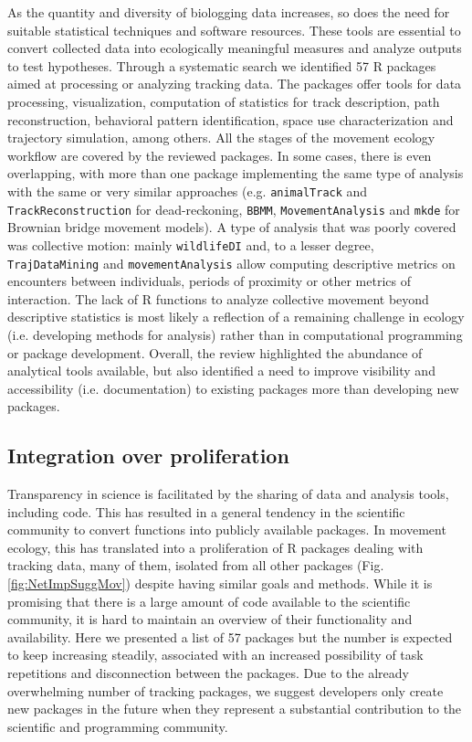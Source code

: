 \documentclass[a4paper,12pt]{article}
\newcommand{\Rpkg}[1]{\texttt{#1}}
\begin{document}
	As the quantity and diversity of biologging data increases, so does the need for suitable statistical techniques and software resources. These tools are essential to convert collected data into ecologically meaningful measures and analyze outputs to test hypotheses. Through a systematic search we identified 57 R packages aimed at processing or analyzing tracking data. The packages offer tools for data processing, visualization, computation of statistics for track description, path reconstruction, behavioral pattern identification, space use characterization and trajectory simulation, among others. 
	All the stages of the movement ecology workflow are covered by the reviewed packages. In some cases, there is even overlapping, with more than one package implementing the same type of analysis with the same or very similar approaches (e.g. \Rpkg{animalTrack} and \Rpkg{TrackReconstruction} for dead-reckoning, \Rpkg{BBMM}, \Rpkg{MovementAnalysis} and \Rpkg{mkde} for Brownian bridge movement models). 
	A type of analysis that was poorly covered was collective motion: mainly \Rpkg{wildlifeDI} and, to a lesser degree, \Rpkg{TrajDataMining} and \Rpkg{movementAnalysis} allow computing descriptive metrics on encounters between individuals, periods of proximity or other metrics of interaction. The lack of R functions to analyze collective movement beyond descriptive statistics is most likely a reflection of a remaining challenge in ecology (i.e. developing methods for analysis) rather than in computational programming or package development. 
	Overall, the review highlighted the abundance of analytical tools available, but also identified a need to improve visibility and accessibility (i.e. documentation) to existing packages more than developing new packages.     
	
	
	\subsection*{Integration over proliferation}
	
	Transparency in science is facilitated by the sharing of data and analysis tools, including code. This has resulted in a general tendency in the scientific community to convert functions into publicly available packages. In movement ecology, this has translated into a proliferation of R packages dealing with tracking data, many of them, isolated from all other packages (Fig. \ref{fig:NetImpSuggMov}) despite having similar goals and methods. While it is promising that there is a large amount of code available to the scientific community, it is hard to maintain an overview of their functionality and availability. Here we presented a list of 57 packages but the number is expected to keep increasing steadily, associated with an increased possibility of task repetitions and disconnection between the packages. Due to the already overwhelming number of tracking packages, we suggest developers only create new packages in the future when they represent a substantial contribution to the scientific and programming community. 
	
\end{document}
